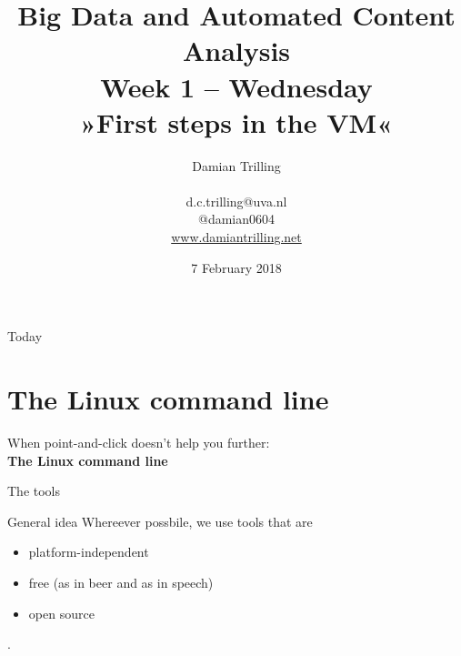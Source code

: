 \documentclass{beamer}
\begin{document}
\title[Big Data and Automated Content Analysis]{\textbf{Big Data and Automated Content Analysis} \\ Week 1 -- Wednesday \\ »First steps in the VM«}
\author[Damian Trilling]{Damian Trilling \\ ~ \\ \footnotesize{d.c.trilling@uva.nl \\@damian0604} \\ \url{www.damiantrilling.net}}
\date{7 February 2018}


\begin{frame}{}
\titlepage
\end{frame}

\begin{frame}{Today}
\tableofcontents
\end{frame}



\section{The Linux command line}

\begin{frame}
	When point-and-click doesn't help you further:\\
	\textbf{The Linux command line}
\end{frame}

\begin{frame}{The tools}
\begin{block}{General idea}
Whereever possbile, we use tools that are
\begin{itemize}
\item platform-independent 
\item free (as in beer and as in speech)
\item open source
\end{itemize}
\end{block}

.

\end{frame}
\end{document}
